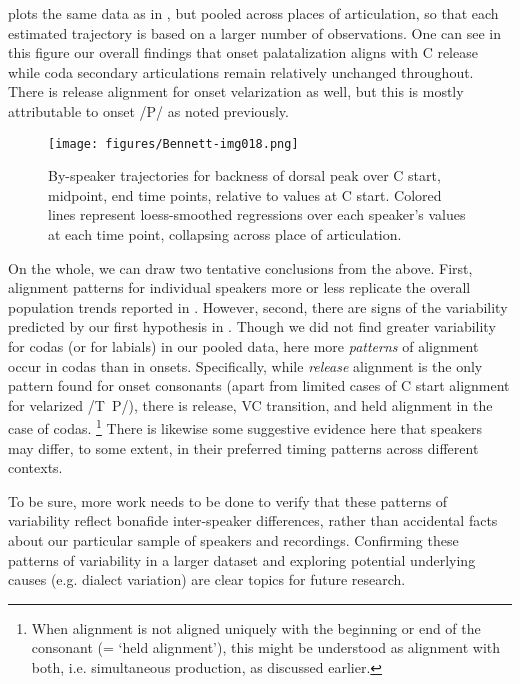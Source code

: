 \documentclass[output=paper,colorlinks,citecolor=brown]{langscibook}
\newcommand{\vel}{\ipa{ˠ}}
\begin{document}
 plots the same data as in , but pooled across places of articulation, so that each estimated trajectory is based on a larger number of observations. One can see in this figure our overall findings that onset palatalization aligns with C release while coda secondary articulations remain relatively unchanged throughout. There is release alignment for onset velarization as well, but this is mostly attributable to onset /P\vel/ as noted previously.

\begin{figure}
    \centering
    \texttt{[image: figures/Bennett-img018.png]}
    \caption{By-speaker trajectories for backness of dorsal peak over C start, midpoint, end time points, relative to values at C start. Colored lines represent loess-smoothed regressions over each speaker's values at each time point, collapsing across place of articulation.}
    \label{fig:trajectories-SPK-noplace}
\end{figure}

On the whole, we can draw two tentative conclusions from the above. First, alignment patterns for individual speakers more or less replicate the overall population trends reported in . However, second, there are signs of the variability predicted by our first hypothesis in . Though we did not find greater variability for codas (or for labials) in our pooled data, here more \emph{patterns} of alignment occur in codas than in onsets. Specifically, while \emph{release} alignment is the only pattern found for onset consonants (apart from limited cases of C start alignment for velarized /T\vel\ P\vel/), there is release, VC transition, and held alignment in the case of codas. \footnote{When alignment is not aligned uniquely with the beginning or end of the consonant (= `held alignment'), this might be understood as alignment with both, i.e. simultaneous production, as discussed earlier.} There is likewise some suggestive evidence here that speakers may differ, to some extent, in their preferred timing patterns across different contexts.

To be sure, more work needs to be done to verify that these patterns of variability reflect bonafide inter-speaker differences, rather than accidental facts about our particular sample of speakers and recordings. Confirming these patterns of variability in a larger dataset and exploring potential underlying causes (e.g. dialect variation) are  clear topics for future research.
\end{document}
